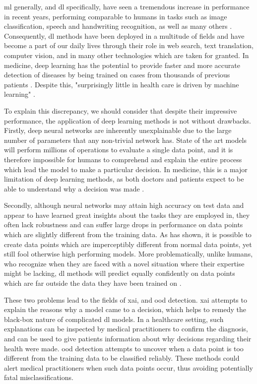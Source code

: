 \documentclass[UKenglish]{uiomasterthesis} %
\theoremstyle{definition}
\begin{document}
\ac{ml} generally, and \ac{dl} specifically, have seen a tremendous increase in performance in recent years, performing comparable to humans in tasks such as image classification, speech and handwriting recognition, as well as many others \cite{performance}. Consequently, \ac{dl} methods have been deployed in a multitude of fields and have become a part of our daily lives through their role in web search, text translation, computer vision, and in many other technologies which are taken for granted. In medicine, deep learning has the potential to provide faster and more accurate detection of diseases by being trained on cases from thousands of previous patients \cite{xaisurvey}. Despite this, "surprisingly little in health care is driven by machine learning" \cite{dlmed}.


To explain this discrepancy, we should consider that despite their impressive performance, the application of deep learning methods is not without drawbacks. Firstly, deep neural networks are inherently unexplainable due to the large number of parameters that any non-trivial network has. State of the art models will perform millions of operations to evaluate a single data point, and it is therefore impossible for humans to comprehend and explain the entire process which lead the model to make a particular decision. In medicine, this is a major limitation of deep learning methods, as both doctors and patients expect to be able to understand why a decision was made \cite{tingsim}.

Secondly, although neural networks may attain high accuracy on test data and appear to have learned great insights about the tasks they are employed in, they often lack robustness and can suffer large drops in performance on data points which are slightly different from the training data. As \cite{intriguing} has shown, it is possible to create data points which are imperceptibly different from normal data points, yet still fool otherwise high performing models. More problematically, unlike humans, who recognize when they are faced with a novel situation where their expertise might be lacking, \ac{dl} methods will predict equally confidently on data points which are far outside the data they have been trained on \cite{tingsim}.

These two problems lead to the fields of \ac{xai}, and \ac{ood} detection. \ac{xai} attempts to explain the reasons why a model came to a decision, which helps to remedy the black-box nature of complicated \ac{dl} models. In a healthcare setting, such explanations can be inspected by medical practitioners to confirm the diagnosis, and can be used to give patients information about why decisions regarding their health were made. \ac{ood} detection attempts to uncover when a data point is too different from the training data to be classified reliably. These methods could alert medical practitioners when such data points occur, thus avoiding potentially fatal misclassifications.
\end{document}

